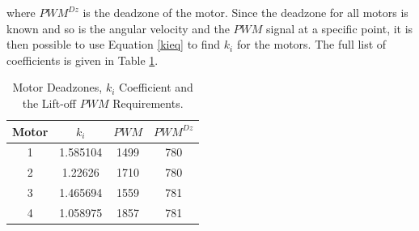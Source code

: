 where $PWM^{Dz}$ is the deadzone of the motor.
Since the deadzone for all motors is known and so is the angular velocity and the $PWM$ signal at a specific point, it is then possible to use Equation \ref{kieq} to find $k_i$ for the motors. The full list of coefficients is given in Table \ref{motorCoeffs}.

\begin{table}[H]
\centering
\begin{tabular}{|c|c|c|c|}
\hline
Motor	& $k_i$ 	& $PWM$ 	& $PWM^{Dz}$ 	\\ \hline
1 		& 1.585104	& 1499		& 780			\\ \hline
2 		& 1.22626	& 1710		& 780			\\ \hline
3 		& 1.465694	& 1559		& 781			\\ \hline
4 		& 1.058975	& 1857		& 781			\\ \hline

\end{tabular}
\caption{Motor Deadzones, $k_i$ Coefficient and the Lift-off $PWM$ Requirements.}
\label{motorCoeffs}
\end{table}